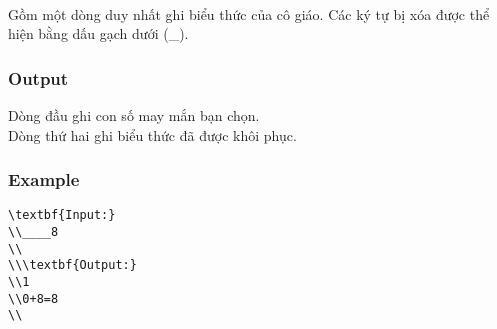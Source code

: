 \\   Gồm một dòng duy nhất ghi biểu thức của cô giáo. Các ký tự bị xóa được thể hiện bằng dấu gạch dưới (\_).  

\subsubsection{   Output  }

   Dòng đầu ghi con số may mắn bạn chọn.   
\\   Dòng thứ hai ghi biểu thức đã được khôi phục.  

\subsubsection{   Example  }
\begin{verbatim}
\textbf{Input:}
\\____8
\\
\\\textbf{Output:}
\\1
\\0+8=8
\\\end{verbatim}